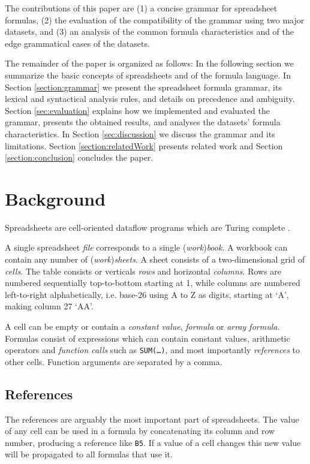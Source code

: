 \documentclass[conference]{IEEEtran}
\begin{document}
The contributions of this paper are (1) a concise grammar for spreadsheet formulas, (2) the evaluation of the compatibility of the grammar using two major datasets, and (3) an analysis of the common formula characteristics and of the edge grammatical cases of the datasets.

The remainder of the paper is organized as follows: In the following section we summarize the basic concepts of spreadsheets and of the formula language. In Section \ref{section:grammar} we present the spreadsheet formula grammar, its lexical and syntactical analysis rules, and details on precedence and ambiguity. Section \ref{sec:evaluation} explains how we implemented and evaluated the grammar, presents the obtained results, and analyses the datasets' formula characteristics. In Section \ref{sec:discussion} we discuss the grammar and its limitations. Section \ref{section:relatedWork} presents related work and Section \ref{section:conclusion} concludes the paper.

\section{Background}

Spreadsheets are cell-oriented dataflow programs which are Turing complete \cite{ExcelTuringComplete}.

A single spreadsheet \emph{file} corresponds to a single (\emph{work})\emph{book}.
A workbook can contain any number of (\emph{work})\emph{sheets}.
A sheet consists of a two-dimensional grid of \emph{cells}.
The table consists or verticals \emph{rows} and horizontal \emph{columns}.
Rows are numbered sequentially top-to-bottom starting at 1, while columns are numbered left-to-right alphabetically, i.e. base-26 using A to Z as digits, starting at `A', making column 27 `AA'.

A cell can be empty or contain a \emph{constant value}, \emph{formula} or \emph{array formula}.
Formulas consist of expressions which can contain constant values, arithmetic operators and \emph{function calls} such as \texttt{SUM(\ldots)}, and most importantly \emph{references} to other cells.
Function arguments are separated by a comma.

\subsection{References}
The references are arguably the most important part of spreadsheets.
The value of any cell can be used in a formula by concatenating its column and row number, producing a reference like \texttt{B5}.
If a value of a cell changes this new value will be propagated to all formulas that use it.
\end{document}
